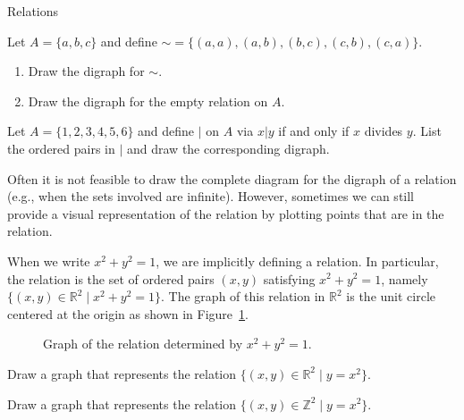 \begin{section}{Relations}
\begin{problem}
Let $A=\{a,b,c\}$ and define ${\sim}=\{(a,a),(a,b),(b,c),(c,b),(c,a)\}$.  
\begin{enumerate}[label=\textrm{(\alph*)}]
\item Draw the digraph for $\sim$.
\item Draw the digraph for the empty relation on $A$.
\end{enumerate}
\end{problem}

\begin{problem}
Let $A=\{1,2,3,4,5,6\}$ and define $|$ on $A$ via $x|y$ if and only if $x$ divides $y$.  List the ordered pairs in $|$ and draw the corresponding digraph.
\end{problem}

Often it is not feasible to draw the complete diagram for the digraph of a relation (e.g., when the sets involved are infinite).  However, sometimes we can still provide a visual representation of the relation by plotting points that are in the relation.

\begin{example}
When we write $x^2+y^2=1$, we are implicitly defining a relation.  In particular, the relation is the set of ordered pairs $(x,y)$ satisfying $x^2+y^2=1$, namely $\{(x,y)\in \mathbb{R}^2 \mid x^2+y^2=1\}$. The graph of this relation in $\mathbb{R}^2$ is the unit circle centered at the origin as shown in Figure~\ref{fig:unit circle}.
\end{example}

\begin{figure}[h!]
\centering
{}
\caption{Graph of the relation determined by $x^2+y^2=1$.}\label{fig:unit circle}
\end{figure}

\begin{problem}
Draw a graph that represents the relation $\{(x,y)\in \mathbb{R}^2 \mid y=x^2\}$.
\end{problem}

\begin{problem}
Draw a graph that represents the relation $\{(x,y)\in \mathbb{Z}^2 \mid y=x^2\}$.
\end{problem}


\end{section}
